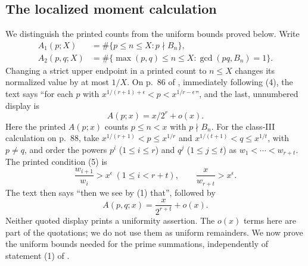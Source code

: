 \documentclass[10pt]{article}
\theoremstyle{remark}
\begin{document}
\subsection{The localized moment calculation}\label{subsec:local}
We distinguish the printed counts from the uniform bounds proved below.
Write
\[
 \begin{aligned}
 A_1(p;X)&=\#\{p\leq n\leq X:p\nmid B_n\},\\
 A_2(p,q;X)&=\#\{\max(p,q)\leq n\leq X:\gcd(pq,B_n)=1\}.
 \end{aligned}
\]
Changing a strict upper endpoint in a printed count to $n\leq X$
changes its normalized value by at most $1/X$.
On p.~86 of \cite{EGRS}, immediately following (4), the text says
``for each $p$ with $x^{1/(r+1)+\epsilon}<p<x^{1/r-\epsilon}$'',
and the last, unnumbered display is
\begin{equation}\label{eq:input1}
 A(p;x)=x/2^r+o(x).
\end{equation}
Here the printed $A(p;x)$ counts $p\leq n<x$ with $p\nmid B_n$.
For the class-III calculation on p.~88, take
$x^{1/(r+1)}<p\leq x^{1/r}$ and
$x^{1/(t+1)}<q\leq x^{1/t}$, with $p\ne q$, and
order the powers $p^i$ ($1\leq i\leq r$) and $q^j$ ($1\leq j\leq t$)
as $w_1<\cdots<w_{r+t}$. The printed condition (5) is
\[
 \frac{w_{i+1}}{w_i}>x^\epsilon\ (1\leq i<r+t),\qquad
 \frac{x}{w_{r+t}}>x^\epsilon.
\]
The text then says ``then we see by (1) that'', followed by
\begin{equation}\label{eq:input2}
 A(p,q;x)=\frac{x}{2^{r+t}}+o(x).
\end{equation}
Neither quoted display prints a uniformity assertion. The $o(x)$
terms here are part of the quotations; we do not use them as uniform
remainders. We now prove the uniform bounds needed for the prime
summations, independently of statement (1) of \cite{EGRS}.
\end{document}
